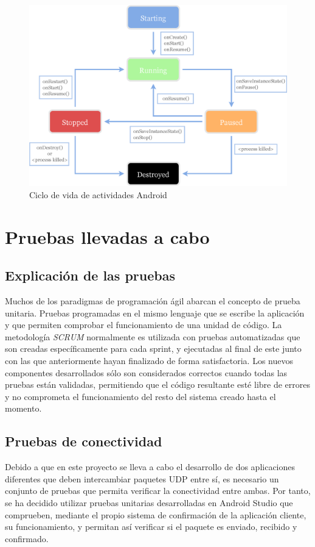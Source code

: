 \documentclass[12pt]{article}
\begin{document}
        \begin{figure}[h!]
            \centering
                \includegraphics[scale=0.7]{android_lifecycle.eps}
                \caption{Ciclo de vida de actividades Android}
                \label{fig:android_lifecycle}
        \end{figure}

\section{Pruebas llevadas a cabo}
    \subsection{Explicación de las pruebas}
    Muchos de los paradigmas de programación ágil abarcan el concepto de prueba unitaria. Pruebas programadas en el mismo lenguaje que se escribe la aplicación y que permiten comprobar el funcionamiento de una unidad de código. La metodología \textit{SCRUM} normalmente es utilizada con pruebas automatizadas que son creadas específicamente para cada sprint, y ejecutadas al final de este junto con las que anteriormente hayan finalizado de forma satisfactoria. Los nuevos componentes desarrollados sólo son considerados correctos cuando todas las pruebas están validadas, permitiendo que el código resultante esté libre de errores y no comprometa el funcionamiento del resto del sistema creado hasta el momento. 

    \subsection{Pruebas de conectividad}
    Debido a que en este proyecto se lleva a cabo el desarrollo de dos aplicaciones diferentes que deben intercambiar paquetes UDP entre sí, es necesario un conjunto de pruebas que permita verificar la conectividad entre ambas. Por tanto, se ha decidido utilizar pruebas unitarias desarrolladas en Android Studio que comprueben, mediante el propio sistema de confirmación de la aplicación cliente, su funcionamiento, y permitan así verificar si el paquete es enviado, recibido y confirmado.
\end{document}
